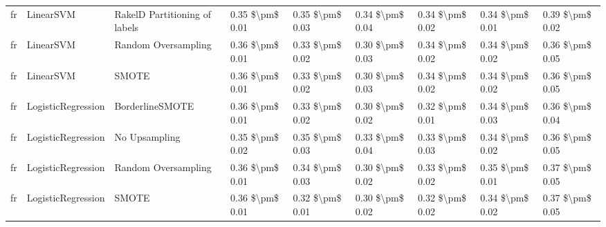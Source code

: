 \begin{tabular}{lllllllll}
      fr &                       LinearSVM & RakelD Partitioning of labels & 0.35 \$\textbackslash pm\$ 0.01 &           0.35 \$\textbackslash pm\$ 0.03 &       0.34 \$\textbackslash pm\$ 0.04 &        0.34 \$\textbackslash pm\$ 0.02 &                         0.34 \$\textbackslash pm\$ 0.01 &     0.39 \$\textbackslash pm\$ 0.02 \\
      fr &                       LinearSVM &           Random Oversampling & 0.36 \$\textbackslash pm\$ 0.01 &           0.33 \$\textbackslash pm\$ 0.02 &       0.30 \$\textbackslash pm\$ 0.03 &        0.34 \$\textbackslash pm\$ 0.02 &                         0.34 \$\textbackslash pm\$ 0.02 &     0.36 \$\textbackslash pm\$ 0.05 \\
      fr &                       LinearSVM &                         SMOTE & 0.36 \$\textbackslash pm\$ 0.01 &           0.33 \$\textbackslash pm\$ 0.02 &       0.30 \$\textbackslash pm\$ 0.03 &        0.34 \$\textbackslash pm\$ 0.02 &                         0.34 \$\textbackslash pm\$ 0.02 &     0.36 \$\textbackslash pm\$ 0.05 \\
      fr &              LogisticRegression &               BorderlineSMOTE & 0.36 \$\textbackslash pm\$ 0.01 &           0.33 \$\textbackslash pm\$ 0.02 &       0.30 \$\textbackslash pm\$ 0.02 &        0.32 \$\textbackslash pm\$ 0.01 &                         0.34 \$\textbackslash pm\$ 0.03 &     0.36 \$\textbackslash pm\$ 0.04 \\
      fr &              LogisticRegression &                 No Upsampling & 0.35 \$\textbackslash pm\$ 0.02 &           0.35 \$\textbackslash pm\$ 0.03 &       0.33 \$\textbackslash pm\$ 0.04 &        0.33 \$\textbackslash pm\$ 0.03 &                         0.34 \$\textbackslash pm\$ 0.02 &     0.36 \$\textbackslash pm\$ 0.05 \\
      fr &              LogisticRegression &           Random Oversampling & 0.36 \$\textbackslash pm\$ 0.01 &           0.34 \$\textbackslash pm\$ 0.03 &       0.30 \$\textbackslash pm\$ 0.02 &        0.33 \$\textbackslash pm\$ 0.02 &                         0.35 \$\textbackslash pm\$ 0.01 &     0.37 \$\textbackslash pm\$ 0.05 \\
      fr &              LogisticRegression &                         SMOTE & 0.36 \$\textbackslash pm\$ 0.01 &           0.32 \$\textbackslash pm\$ 0.01 &       0.30 \$\textbackslash pm\$ 0.02 &        0.32 \$\textbackslash pm\$ 0.02 &                         0.34 \$\textbackslash pm\$ 0.02 &     0.37 \$\textbackslash pm\$ 0.05 \\

\end{tabular}
